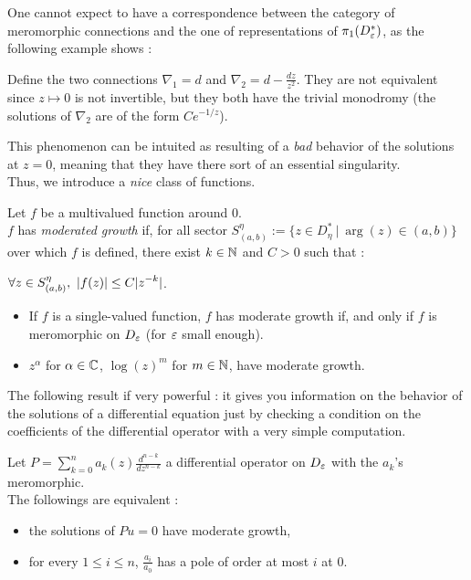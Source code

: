 \medskip
One cannot expect to have a correspondence between the category of meromorphic connections and the one of representations of $\pi_1(D_\varepsilon^*)$, as the following example shows :


\begin{myex} \label{pathological_ex_regular_connection}
Define the two connections $\nabla_1 = d$ and $\nabla_2 = d - \frac{dz}{z^2}$. They are not equivalent since $z \mapsto 0$ is not invertible, but they both have the trivial monodromy (the solutions of $\nabla_2$ are of the form $Ce^{-1/z}$).
\end{myex}


This phenomenon can be intuited as resulting of a \textit{bad} behavior of the solutions at $z=0$, meaning that they have there sort of an essential singularity.\\
Thus, we introduce a \textit{nice} class of functions.


\begin{mydef}
Let $f$ be a multivalued function around 0.\\
$f$ has \textit{moderated growth} if, for all sector $S^\eta_{(a,b)} := \{z \in D_\eta^* ~|~ \arg(z) \in (a,b)\}$ over which $f$ is defined, there exist $k \in \mathbb{N}$ and $C>0$ such that :
\begin{center}
$\displaystyle \forall z \in S^\eta_{(a,b)}, ~|f(z)| \leq C|z^{-k}|$.
\end{center}
\end{mydef}


\begin{myex}
\begin{itemize}
\item[1)] If $f$ is a single-valued function, $f$ has moderate growth if, and only if $f$ is meromorphic on $D_\varepsilon$ (for $\varepsilon$ small enough).
\item[2)] $z^\alpha$ for $\alpha\in \mathbb{C}$, $\log(z)^m$ for $m \in \mathbb{N}$, have moderate growth.
\end{itemize}
\end{myex}


The following result if very powerful : it gives you information on the behavior of the solutions of a differential equation just by checking a condition on the coefficients of the differential operator with a very simple computation.


\begin{mytheo}[Fuchs]
Let $P = \sum_{k=0}^n a_k(z) \frac{d^{n-k}}{dz^{n-k}}$ a differential operator on $D_\varepsilon$ with the $a_k$'s meromorphic.\\
The followings are equivalent :
\begin{itemize}
\item[i)] the solutions of $Pu=0$ have moderate growth,
\item[ii)] for every $1 \leq i \leq n$, $\frac{a_i}{a_0}$ has a pole of order at most $i$ at $0$.
\end{itemize}
\end{mytheo}


